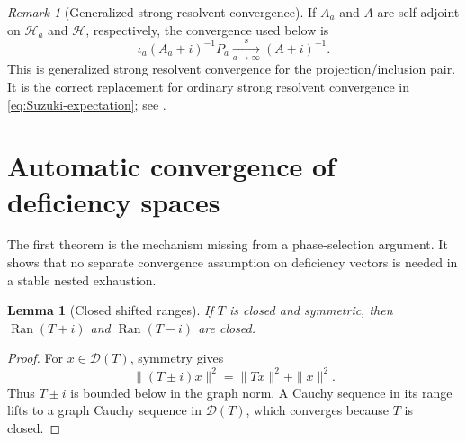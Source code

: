 \documentclass[11pt]{article}
\newtheorem{lemma}[theorem]{Lemma}
\theoremstyle{remark}
\newtheorem{remark}[theorem]{Remark}
\newcommand{\Hh}{\mathcal H}
\newcommand{\Dom}{\mathcal D}
\newcommand{\Ran}{\operatorname{Ran}}
\begin{document}
\begin{remark}[Generalized strong resolvent convergence]\label{rem:GSRC}
If $A_a$ and $A$ are self-adjoint on $\Hh_a$ and $\Hh$, respectively, the convergence used below
is
\begin{equation}\label{eq:GSRC-def}
 \iota_a(A_a+i)^{-1}P_a
 \xrightarrow[a\to\infty]{\mathrm{s}}
 (A+i)^{-1}.
\end{equation}
This is generalized strong resolvent convergence for the projection/inclusion pair.  It is the
correct replacement for ordinary strong resolvent convergence in
\eqref{eq:Suzuki-expectation}; see \cite{TeschlEtAl2026}.
\end{remark}

\section{Automatic convergence of deficiency spaces}\label{sec:deficiency}

The first theorem is the mechanism missing from a phase-selection argument.  It shows that no
separate convergence assumption on deficiency vectors is needed in a stable nested exhaustion.

\begin{lemma}[Closed shifted ranges]\label{lem:closed-range}
If $T$ is closed and symmetric, then $\Ran(T+i)$ and $\Ran(T-i)$ are closed.
\end{lemma}

\begin{proof}
For $x\in\Dom(T)$, symmetry gives
\begin{equation}\label{eq:shifted-graph-norm}
 \|(T\pm i)x\|^2=\|Tx\|^2+\|x\|^2.
\end{equation}
Thus $T\pm i$ is bounded below in the graph norm.  A Cauchy sequence in its range lifts to a graph
Cauchy sequence in $\Dom(T)$, which converges because $T$ is closed.
\end{proof}
\end{document}
